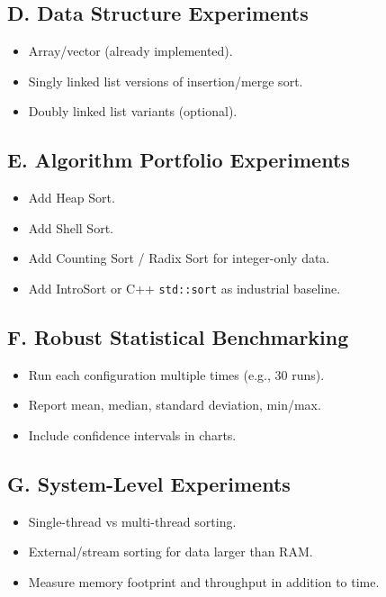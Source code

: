 \documentclass[12pt,a4paper]{article}
\begin{document}
\subsection{D. Data Structure Experiments}
\begin{itemize}
    \item Array/vector (already implemented).
    \item Singly linked list versions of insertion/merge sort.
    \item Doubly linked list variants (optional).
\end{itemize}

\subsection{E. Algorithm Portfolio Experiments}
\begin{itemize}
    \item Add Heap Sort.
    \item Add Shell Sort.
    \item Add Counting Sort / Radix Sort for integer-only data.
    \item Add IntroSort or C++ \texttt{std::sort} as industrial baseline.
\end{itemize}

\subsection{F. Robust Statistical Benchmarking}
\begin{itemize}
    \item Run each configuration multiple times (e.g., 30 runs).
    \item Report mean, median, standard deviation, min/max.
    \item Include confidence intervals in charts.
\end{itemize}

\subsection{G. System-Level Experiments}
\begin{itemize}
    \item Single-thread vs multi-thread sorting.
    \item External/stream sorting for data larger than RAM.
    \item Measure memory footprint and throughput in addition to time.
\end{itemize}
\end{document}
